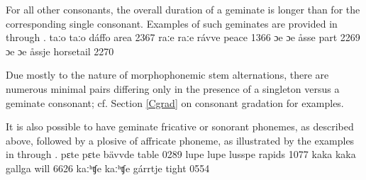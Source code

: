 For all other consonants, the overall duration of a geminate is longer than for the corresponding single consonant. Examples of such geminates are provided in  through .
	{taːo}	{taːo}	{dáffo}	{area\BS{}}		{2367}%
	{raːe}	{raːe}	{rávve}	{peace\BS{}}		{1366}%
	{ɔe}	{ɔe}	{åsse}	{part\BS{}}	{2269}
	{ɔe}	{ɔe}	{åssje}	{horsetail\BS{}}	{2270}

Due mostly to the nature of morphophonemic stem alternations, there are numerous minimal pairs differing only in the presence of a singleton versus a geminate consonant; cf. Section \ref{Cgrad} on consonant gradation for examples. %

It is also possible to have geminate fricative or sonorant phonemes, as described above, followed by a plosive of affricate phoneme, as illustrated by the examples in  through .
	{pɛte}	{pɛte}	{bävvde}	{table\BS{}}		{0289}%
	{lupe}	{lupe}	{lusspe}	{rapids\BS{}}		{1077}%
	{kaka}	{kaka}	{gallga}	{will\BS{}}		{6626}%
	{kaːʰʧe}	{kaːʰʧe}	{gárrtje}	{tight\BS{}}		{0554}%

